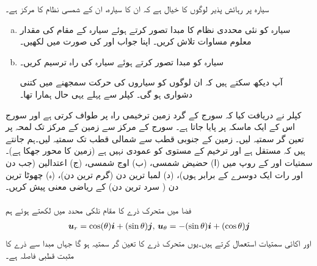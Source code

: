 سیارہ  پر رہائش پذیر  لوگوں کا خیال ہے کہ ان کا سیارہ، ان کے شمسی نظام کا مرکز ہے۔
\begin{enumerate}[a.]
\item
سیارہ  کو نئی محددی نظام کا  مبدا  تصور کرتے ہوئے سیارہ  کے مقام کی مقدار معلوم مساوات تلاش کریں۔ اپنا جواب  اور کی صورت میں لکھیں۔
\item
سیارہ  کو مبدا  تصور کرتے ہوئے  سیارہ  کی راہ ترسیم کریں۔

آپ دیکھ سکتے ہیں کہ ان لوگوں کو سیاروں کی حرکت سمجھنے میں کتنی دشواری ہو گی۔ کپلر سے پہلے یہی حال ہمارا تھا۔ 
\end{enumerate}
کپلر نے دریافت کیا  کہ سورج کے گرد زمین ترخیمی راہ  پر  طواف کرتی ہے اور سورج اس کے ایک ماسکہ پر پایا جاتا ہے۔ سورج کے مرکز سے زمین کے مرکز تک لمحہ  پر تعین گر  سمتیہ  لیں۔ زمین کے جنوبی قطب  سے شمالی قطب تک سمتیہ  لیں۔ہم جانتے ہیں کہ  مستقل ہے اور ترخیم  کے مستوی  کو عمودی نہیں ہے (زمین کا محور  جھکا  ہے)۔ سمتیات  اور  کے روپ میں (ا)  حضیض شمسی، (ب) اوج شمسی، (ج)  اعتدالین  (جب دن اور رات ایک دوسرے کے برابر ہوں)، (د) لمبا ترین دن (گرم ترین دن)، (ہ) چھوٹا ترین دن ( سرد ترین دن) کے  ریاضی  معنی  پیش کریں۔
\\
\\
فضا میں متحرک ذرے  کا مقام نلکی محدد میں لکھتے ہوئے ہم 
\begin{align*}
{\ensuremath{{\boldsymbol{u}}}}_r=\cos(\theta){\boldsymbol{i}}+(\sin\theta){\boldsymbol{j}},\,{{\boldsymbol{u}}}_{\theta}=-(\sin\theta){\boldsymbol{i}}+(\cos\theta){\boldsymbol{j}}
\end{align*}
اور  اکائی سمتیات استعمال کرتے ہیں۔یوں  متحرک ذرے کا  تعین گر سمتیہ   ہو گا جہاں  مبدا سے  ذرے کا مثبت قطبی فاصلہ ہے۔
